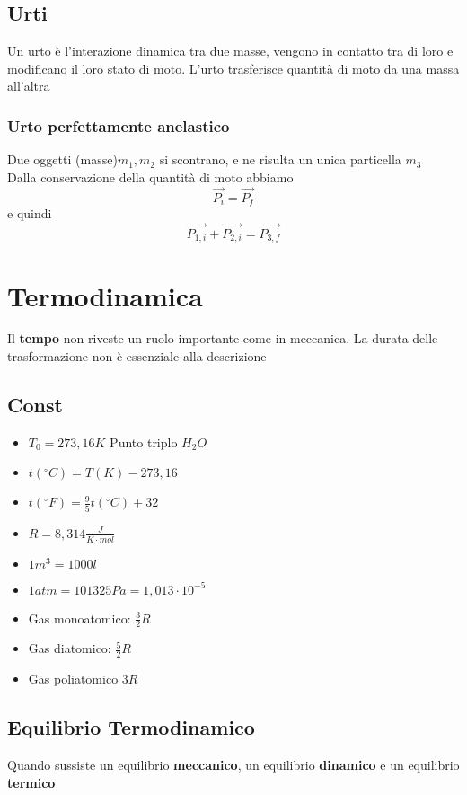 \documentclass[a4paper]{report}
\begin{document}
  \section{Urti}
  Un urto è l'interazione dinamica tra due masse, vengono in contatto tra di loro e modificano il loro stato di moto.
  L'urto trasferisce quantità di moto da una massa all'altra
  \subsection{Urto perfettamente anelastico}
  Due oggetti (masse)$m_1, m_2$ si scontrano, e ne risulta un unica particella $m_3$\\
  Dalla conservazione della quantità di moto abbiamo
  $$ \vec{P_i} = \vec{P_f} $$
  e quindi
  $$ \vec{P_{1,i}} + \vec{P_{2,i}} = \vec{P_{3,f}} $$




  \chapter{Termodinamica}
  Il \textbf{tempo} non riveste un ruolo importante come in meccanica. La durata delle trasformazione non è essenziale alla descrizione

  \section{Const}
  \begin{itemize}
    \item $T_0 = 273,16 K$ Punto triplo $H_2O$
    \item $t(^\circ C)= T(K) - 273,16$
    \item $t(^\circ F)= \frac{9}{5} t(^\circ C) + 32$
    \item $R = 8,314 \frac{J}{K \cdot mol}$
    \item $1 m^3 = 1000l$
    \item $1 atm = 101325Pa = 1,013 \cdot 10^{-5}$
    \item Gas monoatomico: $\frac{3}{2}R$
    \item Gas diatomico: $\frac{5}{2}R$
    \item Gas poliatomico $3 R$
  \end{itemize}

  \section{Equilibrio Termodinamico}
  Quando sussiste un equilibrio \textbf{meccanico}, un equilibrio \textbf{dinamico} e un equilibrio \textbf{termico}
\end{document}
